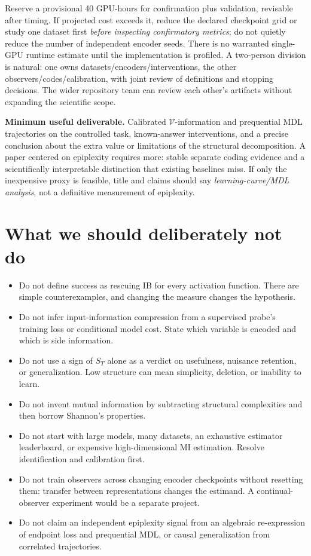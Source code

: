 \documentclass[11pt,a4paper]{article}
\newcommand{\V}{\mathcal V}
\begin{document}
Reserve a provisional 40 GPU-hours for confirmation plus validation, revisable after timing. If projected cost exceeds it, reduce the declared checkpoint grid or study one dataset first \emph{before inspecting confirmatory metrics}; do not quietly reduce the number of independent encoder seeds. There is no warranted single-GPU runtime estimate until the implementation is profiled. A two-person division is natural: one owns datasets/encoders/interventions, the other observers/codes/calibration, with joint review of definitions and stopping decisions. The wider repository team can review each other's artifacts without expanding the scientific scope.

\textbf{Minimum useful deliverable.} Calibrated $\V$-information and prequential MDL trajectories on the controlled task, known-answer interventions, and a precise conclusion about the extra value or limitations of the structural decomposition. A paper centered on epiplexity requires more: stable separate coding evidence and a scientifically interpretable distinction that existing baselines miss. If only the inexpensive proxy is feasible, title and claims should say \emph{learning-curve/MDL analysis}, not a definitive measurement of epiplexity.

\section{What we should deliberately not do}
\begin{itemize}
\item Do not define success as rescuing IB for every activation function. There are simple counterexamples, and changing the measure changes the hypothesis.
\item Do not infer input-information compression from a supervised probe's training loss or conditional model cost. State which variable is encoded and which is side information.
\item Do not use a sign of $S_T$ alone as a verdict on usefulness, nuisance retention, or generalization. Low structure can mean simplicity, deletion, or inability to learn.
\item Do not invent mutual information by subtracting structural complexities and then borrow Shannon's properties.
\item Do not start with large models, many datasets, an exhaustive estimator leaderboard, or expensive high-dimensional MI estimation. Resolve identification and calibration first.
\item Do not train observers across changing encoder checkpoints without resetting them: transfer between representations changes the estimand. A continual-observer experiment would be a separate project.
\item Do not claim an independent epiplexity signal from an algebraic re-expression of endpoint loss and prequential MDL, or causal generalization from correlated trajectories.
\end{itemize}
\end{document}
